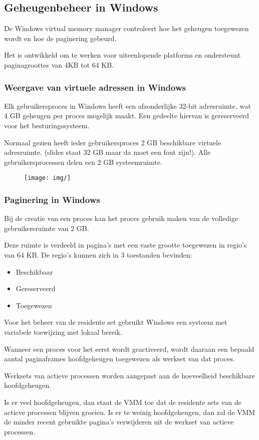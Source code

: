 \subsection{Geheugenbeheer in Windows}

De Windows virtual memory manager controleert hoe het geheugen toegewezen wordt en hoe de paginering gebeurd.

Het is ontwikkeld om te werken voor uiteenlopende platforms en ondersteunt paginagroottes van 4KB tot 64 KB.

\subsubsection{Weergave van virtuele adressen in Windows}

Elk gebruikersproces in Windows heeft een afzonderlijke 32-bit adresruimte, wat 4 GB geheugen per proces mogelijk maakt. Een gedeelte hiervan is gereserveerd voor het besturingssysteem.

Normaal gezien heeft ieder gebruikersproces 2 GB beschikbare virtuele adresruimte. (slides staat 32 GB maar da moet een fout zijn!). Alle gebruikersprocessen delen een 2 GB systeemruimte.


\begin{figure}[htp]
    \centering
            \texttt{[image: img/]}
        \caption{}
    \label{fig:}
\end{figure}


\subsubsection{Paginering in Windows}

Bij de creatie van een proces kan het proces gebruik maken van de volledige gebruikersruimte van 2 GB.

Deze ruimte is verdeeld in pagina’s met een vaste grootte toegewezen in regio’s van 64 KB. De regio’s kunnen zich in 3 toestanden bevinden:

\begin{itemize}
\item Beschikbaar
\item Gereserveerd
\item Toegewezen
\end{itemize}

Voor het beheer van de residente set gebruikt Windows een systeem met variabele toewijzing met lokaal bereik.

Wanneer een proces voor het eerst wordt geactiveerd, wordt daaraan een bepaald aantal paginaframes hoofdgeheugen toegewezen als werkset van dat proces.

Werksets van actieve processen worden aangepast aan de hoeveelheid beschikbare hoofdgeheugen.

Is er veel hoofdgeheugen, dan staat de VMM toe dat de residente sets van de actieve processen blijven groeien. Is er te weinig hoofdgeheugen, dan zal de VMM de minder recent gebruikte pagina’s verwijderen uit de werkset van actieve processen.




